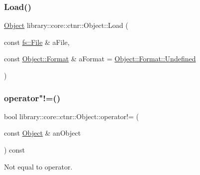 \subsubsection{\texorpdfstring{Load()}{Load()}}
{\footnotesize\ttfamily \mbox{\hyperlink{classlibrary_1_1core_1_1ctnr_1_1_object}{Object}} library\+::core\+::ctnr\+::\+Object\+::\+Load (\begin{DoxyParamCaption}\item[{const \mbox{\hyperlink{classlibrary_1_1core_1_1fs_1_1_file}{fs\+::\+File}} \&}]{a\+File,  }\item[{const \mbox{\hyperlink{classlibrary_1_1core_1_1ctnr_1_1_object_a7bf8961c4ef65f691aa2993ec405c647}{Object\+::\+Format}} \&}]{a\+Format = {\ttfamily \mbox{\hyperlink{classlibrary_1_1core_1_1ctnr_1_1_object_a7bf8961c4ef65f691aa2993ec405c647aec0fc0100c4fc1ce4eea230c3dc10360}{Object\+::\+Format\+::\+Undefined}}} }\end{DoxyParamCaption})\hspace{0.3cm}{\ttfamily [static]}}

\mbox{\label{classlibrary_1_1core_1_1ctnr_1_1_object_a8544bc0fbc6db8b12c8dabd51b075aa5}} 
\subsubsection{\texorpdfstring{operator"!=()}{operator!=()}}
{\footnotesize\ttfamily bool library\+::core\+::ctnr\+::\+Object\+::operator!= (\begin{DoxyParamCaption}\item[{const \mbox{\hyperlink{classlibrary_1_1core_1_1ctnr_1_1_object}{Object}} \&}]{an\+Object }\end{DoxyParamCaption}) const}



Not equal to operator. 


\begin{DoxyCode}{0}
\end{DoxyCode}



